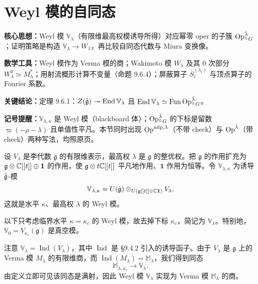 \section{Weyl 模的自同态}

\begin{keypoints}
    \item \textbf{核心思想：}Weyl 模 $\mathbb{V}_\lambda$（有限维最高权模诱导所得）对应幂零 oper 的子簇 $\operatorname{Op}^{\check\lambda}_{{}^LG}$；证明策略是构造 $\mathbb{V}_\lambda\to W_\lambda$，再比较自同态代数与 Miura 变换像。
    \item \textbf{数学工具：}Weyl 模作为 Verma 模的商；Wakimoto 模 $W_\lambda$ 及其 $0$ 次部分 $W^0_\lambda\simeq M^*_\lambda$；用射流概形计算不变量（命题 9.6.4）；屏蔽算子 $\overline{S}^{(\lambda_i)}_i$ 与顶点算子的 Fourier 系数。
    \item \textbf{关键结论：}定理 9.6.1：$Z(\hat{\mathfrak{g}})\twoheadrightarrow\operatorname{End}\mathbb{V}_\lambda$ 且 $\operatorname{End}\mathbb{V}_\lambda\simeq\operatorname{Fun}\operatorname{Op}^{\check\lambda}_{{}^LG}$。
    \item \textbf{记号提醒：}$\mathbb{V}_{\lambda,\kappa}$ 是 Weyl 模（blackboard 体）；$\operatorname{Op}^{\check\lambda}_{{}^LG}$ 的下标是留数 $\varpi(-\rho-\lambda)$ 且单值性平凡。本节同时出现 $\operatorname{Op}^{\mathrm{nilp},\lambda}$（不带 check）与 $\operatorname{Op}^{\check\lambda}$（带 check）两种写法，均照原页。
\end{keypoints}

设 $V_\lambda$ 是李代数 $\mathfrak{g}$ 的有限维表示，最高权 $\lambda$ 是 $\mathfrak{g}$ 的整优权。把 $\mathfrak{g}$ 的作用扩充为 $\mathfrak{g}\otimes\mathbb{C}[[t]]\oplus\mathbf{1}$ 的作用，使 $\mathfrak{g}\otimes t\mathbb{C}[[t]]$ 平凡地作用、$\mathbf{1}$ 作用为恒等。令 $\mathbb{V}_{\lambda,\kappa}$ 为诱导 $\hat{\mathfrak{g}}$-模
\[
    \mathbb{V}_{\lambda,\kappa}
    =U(\hat{\mathfrak{g}})\otimes_{U(\mathfrak{g}[[t]]\oplus\mathbb{C}\mathbf{1})}V_\lambda .
\]
这就是水平 $\kappa$、最高权 $\lambda$ 的 Weyl 模。

以下只考虑临界水平 $\kappa=\kappa_c$ 的 Weyl 模，故去掉下标 $\kappa_c$，简记为 $\mathbb{V}_\lambda$。特别地，$\mathbb{V}_0=V_{\kappa_c}(\mathfrak{g})$ 是真空模。

注意 $\mathbb{V}_\lambda=\operatorname{Ind}(V_\lambda)$，其中 $\operatorname{Ind}$ 是 §9.4.2 引入的诱导函子。由于 $V_\lambda$ 是 $\mathfrak{g}$ 上的 Verma 模 $M_\lambda$ 的有限维商，而 $\operatorname{Ind}(M_\lambda)=\mathbb{M}_\lambda$，我们得到同态
\[
    \mathbb{M}_{\lambda,\kappa_c}\to\mathbb{V}_\lambda .
\]
由定义立即可见该同态是满射，因此 Weyl 模 $\mathbb{V}_\lambda$ 实现为 Verma 模 $\mathbb{M}_\lambda$ 的商。

